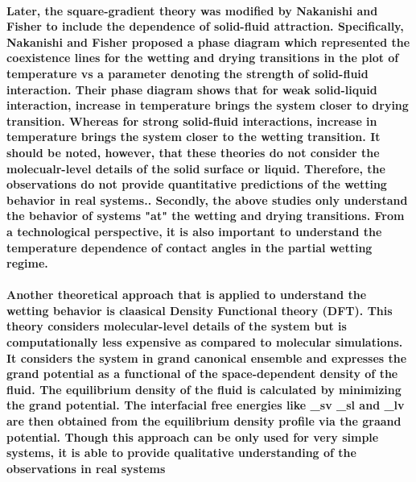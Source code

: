\documentclass[a4paper,12pt,single,pdftex]{scrartcl}
\begin{document}
\label{ID_1622008046}\paragraph{Later, the square-gradient theory was modified by Nakanishi and Fisher to include the dependence of solid-fluid attraction. Specifically, Nakanishi and Fisher proposed a phase diagram which represented the coexistence lines for the wetting and drying transitions in the plot of temperature vs a parameter denoting the strength of solid-fluid interaction. Their phase diagram shows that for weak solid-liquid interaction, increase in temperature brings the system closer to drying transition. Whereas for strong solid-fluid interactions, increase in temperature brings the system closer to the wetting transition. It should be noted, however, that  these theories do not consider the molecualr-level details of the solid surface or liquid. Therefore, the observations do not provide quantitative predictions of the wetting behavior in real systems.. Secondly, the above studies only understand the behavior of systems "at" the wetting and drying transitions. From a technological perspective, it is also important to understand the temperature dependence of contact angles in the partial wetting regime.}

\label{ID_1378614173}\paragraph{Another theoretical approach that is applied to understand the wetting behavior is claasical Density Functional theory (DFT). This theory considers molecular-level details of the system but is computationally less expensive as compared to molecular simulations. It considers the system in grand canonical ensemble and expresses the grand potential as a functional of the space-dependent density of the fluid. The equilibrium density of the fluid is calculated by minimizing the grand potential. The interfacial free energies like \gamma_{sv} \gamma_{sl} and \gamma_{lv} are then obtained from the equilibrium density profile via the graand potential. Though this approach can be only used for very simple systems, it is able to provide qualitative understanding of the observations in real systems}
\end{document}
